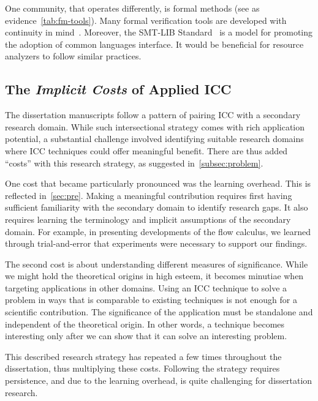 One community, that operates differently, is formal methods (see as
evidence~\autoref{tab:fm-tools}). Many formal verification tools are developed
with continuity in mind~\cite{casc,beyer2022}. Moreover, the SMT-LIB
Standard~\cite{smtlib} is a model for promoting the adoption of common languages
interface. It would be beneficial for resource analyzers to follow similar
practices.

\subsection[The Implicit Costs of Applied ICC]%
{The \emph{Implicit Costs} of Applied ICC}
\label{subsec:res-meta}

The dissertation manuscripts follow a pattern of pairing ICC with a secondary
research domain. While such intersectional strategy comes with rich application
potential, a substantial challenge involved identifying suitable research
domains where ICC techniques could offer meaningful benefit. There are thus
added \enquote{costs} with this research strategy, as suggested
in~\autoref{subsec:problem}.

One cost that became particularly pronounced was the learning overhead. This is
reflected in~\autoref{sec:pre}. Making a meaningful contribution requires first
having sufficient familiarity with the secondary domain to identify research
gaps. It also requires learning the terminology and implicit assumptions of the
secondary domain. For example, in presenting developments of the flow
calculus, we learned through trial-and-error that
experiments were necessary to support our findings.

The second cost is about understanding different measures of significance. While
we might hold the theoretical origins in high esteem, it becomes minutiae when
targeting applications in other domains. Using an ICC technique to solve a
problem in ways that is comparable to existing techniques is not enough for a
scientific contribution. The significance of the application must be standalone
and independent of the theoretical origin. In other words, a technique becomes
interesting only after we can show that it can solve an interesting problem.

This described research strategy has repeated a few times throughout the
dissertation, thus multiplying these costs. Following the strategy requires
persistence, and due to the learning overhead, is quite challenging for
dissertation research.

